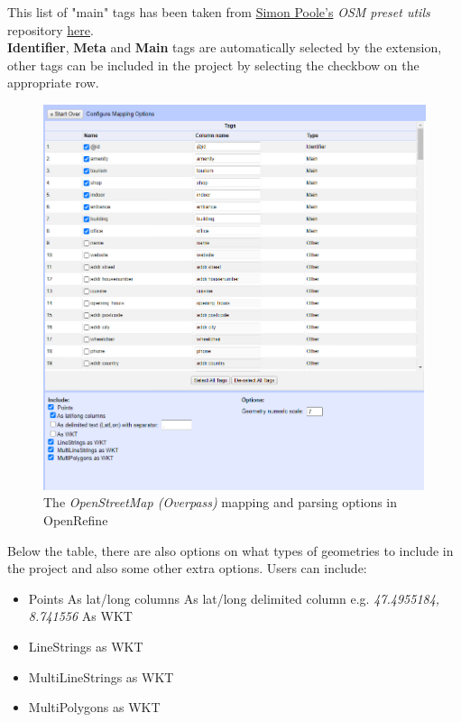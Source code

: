 \newline
This list of "main" tags has been taken from \href{https://github.com/simonpoole}{Simon Poole's} \textit{OSM preset utils}
repository \href{https://github.com/simonpoole/preset-utils/blob/master/src/main/java/ch/poole/osm/presetutils/Tags.java}{here}.\\
\newline
\textbf{Identifier}, \textbf{Meta} and \textbf{Main} tags are automatically selected by the extension, other tags can 
be included in the project by selecting the checkbow on the appropriate row.
\begin{figure}[H]
    \includegraphics[width=\linewidth]{./Figures/OSM_Extractor/osm_extractor_parsing_table.png}
    \caption{The \textit{OpenStreetMap (Overpass)} mapping and parsing options in OpenRefine}
\end{figure}
Below the table, there are also options on what types of geometries to include in the project and also some other extra options.
Users can include:
\begin{itemize}
    \item Points
        \subitem As lat/long columns
        \subitem As lat/long delimited column e.g. \textit{47.4955184, 8.741556}
        \subitem As WKT
    \item LineStrings as WKT
    \item MultiLineStrings as WKT
    \item MultiPolygons as WKT
\end{itemize}
